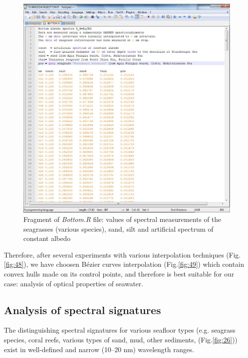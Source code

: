 \documentclass[10pt, a4paper]{article}
\begin{document}
\begin{figure}[H]
	\centering
	\includegraphics[scale=0.25]{Fig-28.jpg}
	\caption{Fragment of \textit{Bottom.R} file: values of spectral measurements of the
		seagrasses (various species), sand, silt and artificial spectrum of constant albedo}
	\label{fig:25}
\end{figure}

Therefore, after several experiments with
various interpolation techniques (Fig.\ref{fig:48}), we have choosen Bézier curves interpolation (Fig.\ref{fig:49}) which contain convex
hulls made on its control points, and therefore is best suitable for our case: analysis of optical
properties of seawater.
%
\subsection{Analysis of spectral signatures}
The distinguishing spectral signatures for various seafloor types (e.g. seagrass species, coral reefs,
various types of sand, mud, other sediments, (Fig.\ref{fig:26})) exist in well-defined and narrow (10–20 nm)
wavelength ranges. 
\end{document}
